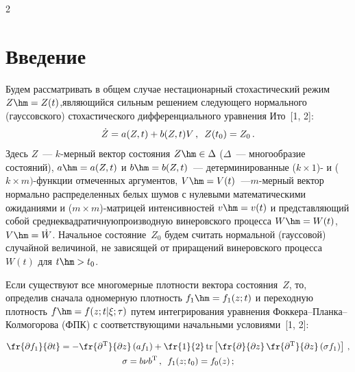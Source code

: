       \begin{multicols}{2}

            \label{st\stat}
     
\section{Введение}
     
    Будем рассматривать в общем случае неста\-ционарный стохастический 
режим $Z\hm=Z(t)$,\linebreak явля\-ющий\-ся сильным решением следующего нормального 
(гауссовского) стохастического дифференциального урав\-не\-ния Ито~[1, 2]:
    \begin{equation}
    \dot{Z}=a(Z,t)+b(Z,t)V\,,\enskip Z(t_0)=Z_0\,.
    \label{e1-sin}
    \end{equation}
Здесь $Z$~--- $k$-мер\-ный вектор со\-сто\-яния $Z\hm\in \Delta$ ($\Delta$~--- 
многообразие со\-сто\-яний), $a\hm=a(Z,t)$ и $b\hm=b(Z,t)$~--- 
детерминированные ($k\times1$)- и ($k\times m)$-функ\-ции отмечен\-ных 
аргументов, $V\hm=V(t)$~---\linebreak $m$-мер\-ный вектор нормально распределенных 
\mbox{белых} шумов с нулевыми математическими ожиданиями и 
($m\times m$)-мат\-ри\-цей интенсивностей $v\hm=v(t)$ и пред\-став\-ля\-ющий 
собой среднеквадратичную\linebreak производную винеровского процесса $W\hm=W(t)$, %
$V\hm=\dot{W}$. Начальное со\-сто\-яние~$Z_0$ будем считать нормальной 
(гауссовой) случайной величиной, не зависящей от приращений винеровского 
процесса $W(t)$ для $t\hm>t_0$.
    
    Если существуют все многомерные плот\-ности вектора со\-сто\-яния~$Z$, то, 
определив сначала одномерную плот\-ность $f_1\hm=f_1(z;t)$ и переходную 
плот\-ность $f\hm=f(z;t\vert \xi;\tau)$ путем интегрирования урав\-не\-ния 
    Фок\-ке\-ра--План\-ка--Кол\-мо\-го\-ро\-ва (ФПК) с соответствующими 
начальными услови\-ями~[1, 2]:

\noindent
    \begin{multline}
    \fr{\partial f_1}{\partial t} = -\fr{\partial^{\mathrm{T}}}{\partial z}\left( af_1\right) 
+\fr{1}{2}\,\mathrm{tr}\left[ \fr{\partial}{\partial z}\,\fr{\partial^{\mathrm{T}}}{\partial z}\left( 
\sigma f_1\right) \right]\,,\\
    \sigma=b\nu b^{\mathrm{T}}\,,\enskip f_1(z;t_0)=f_0(z)\,;
    \label{e2-sin}
    \end{multline}
    

\end{multicols}
